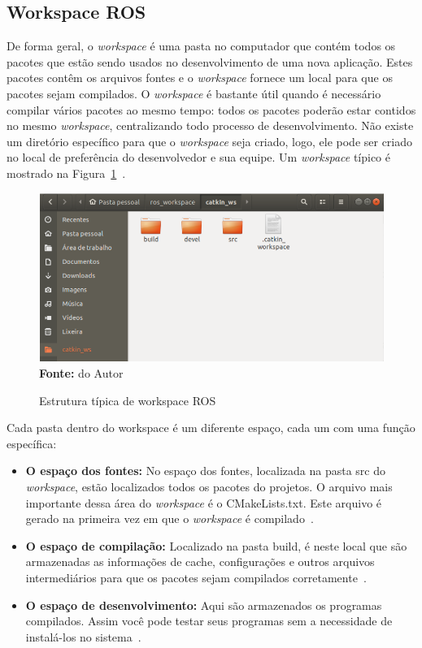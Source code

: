 \subsection{Workspace ROS}
De forma geral, o \textit{workspace} é uma pasta no computador que contém todos os pacotes que estão sendo usados no desenvolvimento de uma nova aplicação. Estes pacotes contêm os arquivos fontes e o \textit{workspace} fornece um local para que os pacotes sejam compilados. O \textit{workspace} é bastante útil quando é necessário compilar vários pacotes ao mesmo tempo: todos os pacotes poderão estar contidos no mesmo \textit{workspace}, centralizando todo processo de desenvolvimento. Não existe um diretório específico para que o \textit{workspace} seja criado, logo, ele pode ser criado no local de preferência do desenvolvedor e sua equipe. Um \textit{workspace} típico é mostrado na Figura~\ref{fig:rosworkspace}~\cite{rosEfetiveProgram}. 

\begin{figure}[ht]
	\caption{Estrutura típica de workspace ROS}
	\begin{center}
		\includegraphics[scale=0.43]{imagens/rosworkspace.png}\\
		{\small \textbf{Fonte:} do Autor}
    \end{center}\label{fig:rosworkspace}
\end{figure}

Cada pasta dentro do workspace é um diferente espaço, cada um com uma função específica:

\begin{itemize}
    \item \textbf{O espaço dos fontes:} No espaço dos fontes, localizada na pasta src do \textit{workspace}, estão localizados todos os pacotes do projetos. O arquivo mais importante dessa área do \textit{workspace} é o CMakeLists.txt. Este arquivo é gerado na primeira vez em que o \textit{workspace} é compilado~\cite{rosEfetiveProgram}.

    \item \textbf{O espaço de compilação:} Localizado na pasta build, é neste local que são armazenadas as informações de cache, configurações e outros arquivos intermediários para que os pacotes sejam compilados corretamente~\cite{rosEfetiveProgram}.

    \item \textbf{O espaço de desenvolvimento:} Aqui são armazenados os programas compilados. Assim você pode testar seus programas sem a necessidade de instalá-los no sistema~\cite{rosEfetiveProgram}.
\end{itemize}

